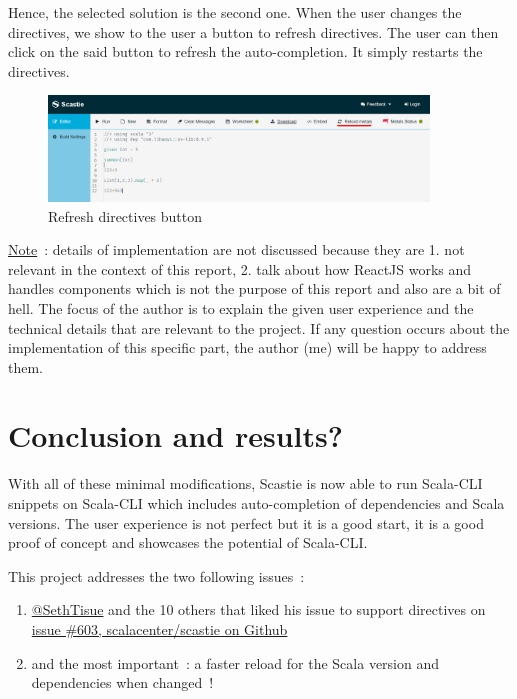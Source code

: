 \documentclass{article}
\begin{document}
Hence, the selected solution is the second one. When the user changes the directives, we show to the user a button to refresh directives. The user can then click on the said button to refresh the auto-completion. It simply restarts the directives.

\begin{figure}[H]
    \centering
    \includegraphics[width=0.9\textwidth]{scastie_reloadmetals.png}
    \caption{Refresh directives button}
\end{figure}

\underline{Note}~: details of implementation are not discussed because they are 1. not relevant in the context of this report, 2. talk about how ReactJS works and handles components which is not the purpose of this report and also are a bit of hell. The focus of the author is to explain the given user experience and the technical details that are relevant to the project. If any question occurs about the implementation of this specific part, the author (me) will be happy to address them.

\section{Conclusion and results?}

With all of these minimal modifications, Scastie is now able to run Scala-CLI snippets on Scala-CLI which includes auto-completion of dependencies and Scala versions. The user experience is not perfect but it is a good start, it is a good proof of concept and showcases the potential of Scala-CLI.

This project addresses the two following issues~:

\begin{enumerate}
    \item \href{https://github.com/SethTisue}{@SethTisue} and the 10 others that liked his issue to support directives on \href{https://github.com/scalacenter/scastie/issues/603}{issue \#603, scalacenter/scastie on Github}
    \item and the most important~: a faster reload for the Scala version and dependencies when changed~!
\end{enumerate}
\end{document}
